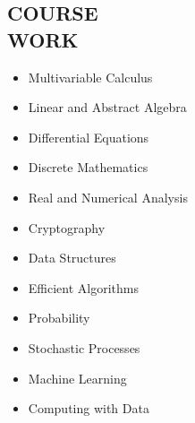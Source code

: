 \documentclass[resmargin, 6pt]{res} %
\begin{document}
\begin{resume}
\section{COURSE \\ WORK}             
               \begin{multicols}{2}
	       \begin{itemize}\itemsep -2pt
		\item Multivariable Calculus\\
 		\item Linear and Abstract Algebra\\
		\item Differential Equations\\
		\item Discrete Mathematics\\
		\item Real and Numerical Analysis\\
		\item Cryptography\\
		\item Data Structures\\
                \item Efficient Algorithms\\
		\item Probability
		\item Stochastic Processes\\
		\item Machine Learning\\
                \item Computing with Data\\
		\end{itemize}
	       \end{multicols}




\end{resume}
\end{document}
